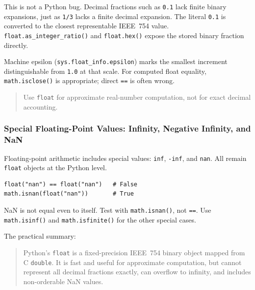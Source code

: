 This is not a Python bug. Decimal fractions such as \texttt{0.1} lack finite binary expansions, just as \texttt{1/3} lacks a finite decimal expansion. The literal \texttt{0.1} is converted to the closest representable IEEE~754 value. \texttt{float.as\_integer\_ratio()} and \texttt{float.hex()} expose the stored binary fraction directly.

Machine epsilon (\texttt{sys.float\_info.epsilon}) marks the smallest increment distinguishable from \texttt{1.0} at that scale. For computed float equality, \texttt{math.isclose()} is appropriate; direct \texttt{==} is often wrong.

\begin{quote}
Use \texttt{float} for approximate real-number computation, not for exact decimal accounting.
\end{quote}

\subsubsection{Special Floating-Point Values: Infinity, Negative Infinity, and NaN}

Floating-point arithmetic includes special values: \texttt{inf}, \texttt{-inf}, and \texttt{nan}. All remain \texttt{float} objects at the Python level.

\begin{verbatim}
float("nan") == float("nan")   # False
math.isnan(float("nan"))       # True
\end{verbatim}

NaN is not equal even to itself. Test with \texttt{math.isnan()}, not \texttt{==}. Use \texttt{math.isinf()} and \texttt{math.isfinite()} for the other special cases.

The practical summary:

\begin{quote}
Python's \texttt{float} is a fixed-precision IEEE~754 binary object mapped from C \texttt{double}. It is fast and useful for approximate computation, but cannot represent all decimal fractions exactly, can overflow to infinity, and includes non-orderable NaN values.
\end{quote}

